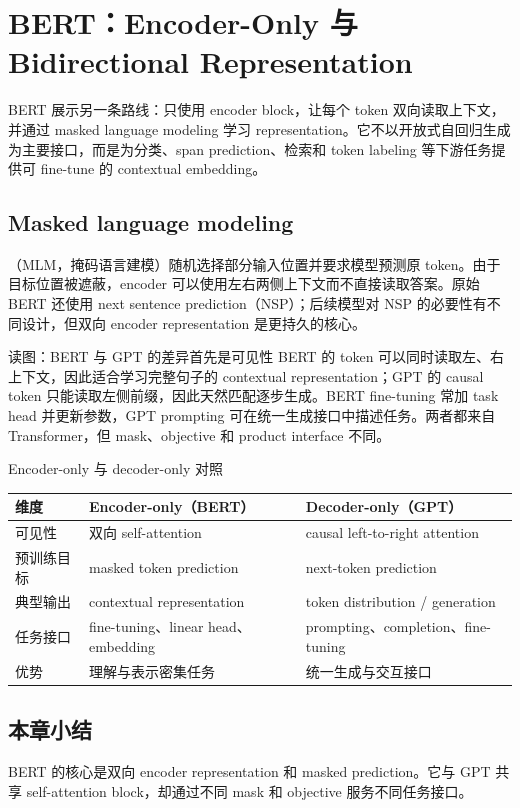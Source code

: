 \section{BERT：Encoder-Only 与 Bidirectional Representation}

BERT 展示另一条路线：只使用 encoder block，让每个 token 双向读取上下文，并通过 masked language modeling 学习 representation。它不以开放式自回归生成为主要接口，而是为分类、span prediction、检索和 token labeling 等下游任务提供可 fine-tune 的 contextual embedding。

\subsection{Masked language modeling}

（MLM，掩码语言建模）随机选择部分输入位置并要求模型预测原 token。由于目标位置被遮蔽，encoder 可以使用左右两侧上下文而不直接读取答案。原始 BERT 还使用 next sentence prediction（NSP）；后续模型对 NSP 的必要性有不同设计，但双向 encoder representation 是更持久的核心。


\begin{knowledgebox}{读图：BERT 与 GPT 的差异首先是可见性}
BERT 的 token 可以同时读取左、右上下文，因此适合学习完整句子的 contextual representation；GPT 的 causal token 只能读取左侧前缀，因此天然匹配逐步生成。BERT fine-tuning 常加 task head 并更新参数，GPT prompting 可在统一生成接口中描述任务。两者都来自 Transformer，但 mask、objective 和 product interface 不同。
\end{knowledgebox}

\begin{importantbox}{Encoder-only 与 decoder-only 对照}
\begin{tabular}{L{0.18\textwidth} L{0.36\textwidth} L{0.36\textwidth}}
\toprule
维度 & Encoder-only（BERT） & Decoder-only（GPT） \\
\midrule
可见性 & 双向 self-attention & causal left-to-right attention \\
预训练目标 & masked token prediction & next-token prediction \\
典型输出 & contextual representation & token distribution / generation \\
任务接口 & fine-tuning、linear head、embedding & prompting、completion、fine-tuning \\
优势 & 理解与表示密集任务 & 统一生成与交互接口 \\
\bottomrule
\end{tabular}
\end{importantbox}


\subsection{本章小结}

BERT 的核心是双向 encoder representation 和 masked prediction。它与 GPT 共享 self-attention block，却通过不同 mask 和 objective 服务不同任务接口。

